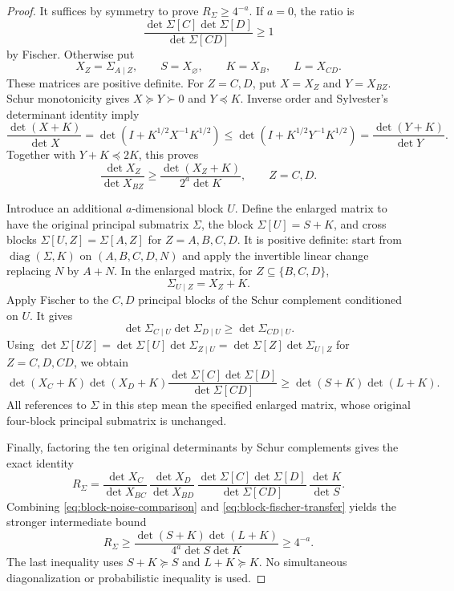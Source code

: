 \documentclass[11pt]{article}
\theoremstyle{remark}
\begin{document}
\begin{proof}
It suffices by symmetry to prove $R_\Sigma\ge4^{-a}$.
If $a=0$, the ratio is
\[
 \frac{\det\Sigma[C]\det\Sigma[D]}{\det\Sigma[CD]}\ge1
\]
by Fischer.
Otherwise put
\[
 X_Z=\Sigma_{A\mid Z},\qquad S=X_\varnothing,\qquad
 K=X_B,\qquad L=X_{CD}.
\]
These matrices are positive definite.  For $Z=C,D$, put $X=X_Z$ and
$Y=X_{BZ}$.  Schur monotonicity gives $X\succeq Y\succ0$ and $Y\preceq K$.
Inverse order and Sylvester's determinant identity imply
\[
 \frac{\det(X+K)}{\det X}
 =\det(I+K^{1/2}X^{-1}K^{1/2})
 \le\det(I+K^{1/2}Y^{-1}K^{1/2})
 =\frac{\det(Y+K)}{\det Y}.
\]
Together with $Y+K\preceq2K$, this proves
\begin{equation}
 \frac{\det X_Z}{\det X_{BZ}}
 \ge\frac{\det(X_Z+K)}{2^a\det K},
 \qquad Z=C,D.
 \label{eq:block-noise-comparison}
\end{equation}

Introduce an additional $a$-dimensional block $U$.  Define the enlarged
matrix to have the original principal submatrix $\Sigma$, the block
$\Sigma[U]=S+K$, and cross blocks
$\Sigma[U,Z]=\Sigma[A,Z]$ for $Z=A,B,C,D$.
It is positive definite: start from $\operatorname{diag}(\Sigma,K)$
on $(A,B,C,D,N)$ and apply the invertible linear change replacing $N$
by $A+N$.  In the enlarged matrix, for $Z\subseteq\{B,C,D\}$,
\[
 \Sigma_{U\mid Z}=X_Z+K.
\]
Apply Fischer to the $C,D$ principal blocks of the Schur complement
conditioned on $U$.  It gives
\[
 \det\Sigma_{C\mid U}\det\Sigma_{D\mid U}
 \ge\det\Sigma_{CD\mid U}.
\]
Using
$\det\Sigma[UZ]=\det\Sigma[U]\det\Sigma_{Z\mid U}
=\det\Sigma[Z]\det\Sigma_{U\mid Z}$ for $Z=C,D,CD$,
we obtain
\begin{equation}
 \det(X_C+K)\det(X_D+K)
 \frac{\det\Sigma[C]\det\Sigma[D]}{\det\Sigma[CD]}
 \ge\det(S+K)\det(L+K).
 \label{eq:block-fischer-transfer}
\end{equation}
All references to $\Sigma$ in this step mean the specified enlarged
matrix, whose original four-block principal submatrix is unchanged.

Finally, factoring the ten original determinants by Schur complements
gives the exact identity
\[
 R_\Sigma=
 \frac{\det X_C}{\det X_{BC}}\,
 \frac{\det X_D}{\det X_{BD}}\,
 \frac{\det\Sigma[C]\det\Sigma[D]}{\det\Sigma[CD]}\,
 \frac{\det K}{\det S}.
\]
Combining \eqref{eq:block-noise-comparison} and
\eqref{eq:block-fischer-transfer} yields the stronger intermediate bound
\[
 R_\Sigma\ge
 \frac{\det(S+K)\det(L+K)}{4^a\det S\det K}\ge4^{-a}.
\]
The last inequality uses $S+K\succeq S$ and $L+K\succeq K$.
No simultaneous diagonalization or probabilistic inequality is used.
\end{proof}
\end{document}
